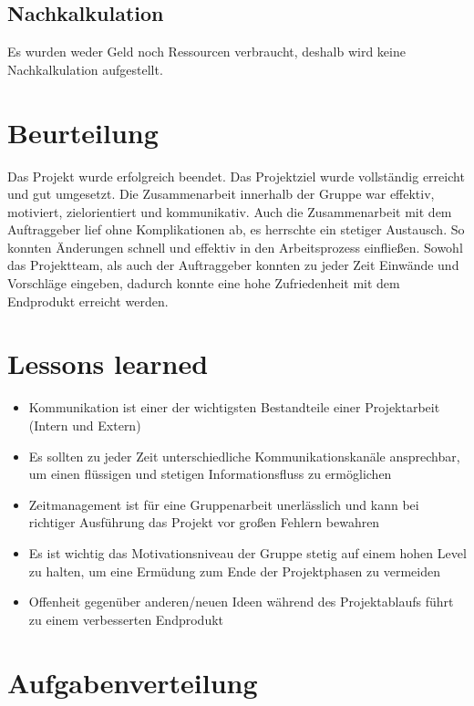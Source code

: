 \documentclass{scrartcl}
\begin{document}
\subsection{Nachkalkulation}
Es wurden weder Geld noch Ressourcen verbraucht, deshalb wird keine Nachkalkulation aufgestellt.

\section{Beurteilung}
Das Projekt wurde erfolgreich beendet. Das Projektziel wurde vollständig erreicht und gut umgesetzt. Die Zusammenarbeit innerhalb der Gruppe war effektiv, motiviert, zielorientiert und kommunikativ. Auch die Zusammenarbeit mit dem Auftraggeber lief ohne Komplikationen ab, es herrschte ein stetiger Austausch. So konnten Änderungen schnell und effektiv in den Arbeitsprozess einfließen. Sowohl das Projektteam, als auch der Auftraggeber konnten zu jeder Zeit Einwände und Vorschläge eingeben, dadurch konnte eine hohe Zufriedenheit mit dem Endprodukt erreicht werden.

\section{Lessons learned}
\begin{itemize}
	\item {Kommunikation ist einer der wichtigsten Bestandteile einer Projektarbeit (Intern und Extern) }
	\item {Es sollten zu jeder Zeit unterschiedliche Kommunikationskanäle ansprechbar, um einen flüssigen und stetigen Informationsfluss zu ermöglichen}
	\item {Zeitmanagement ist für eine Gruppenarbeit unerlässlich und kann bei richtiger Ausführung das Projekt vor großen Fehlern bewahren}
	\item {Es ist wichtig das Motivationsniveau der Gruppe stetig auf einem hohen Level zu halten, um eine Ermüdung zum Ende der Projektphasen zu vermeiden}
	\item {Offenheit gegenüber anderen/neuen Ideen während des Projektablaufs führt zu einem verbesserten Endprodukt}
\end{itemize}

\section{Aufgabenverteilung}
\end{document}

